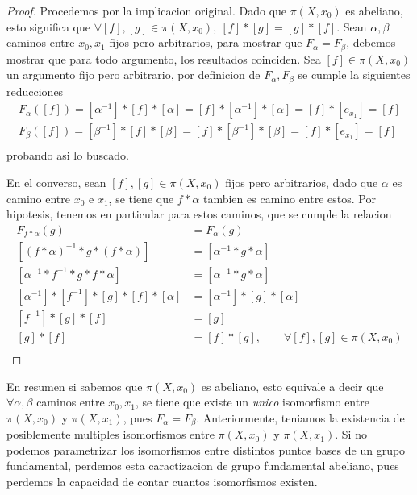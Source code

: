 \begin{proof}
  Procedemos por la implicacion original. Dado que \(\pi (X, x_0)\) es
  abeliano, esto significa que \(\forall [f],[g] \in \pi (X, x_0),\ [f]
  * [g] = [g] * [f]\). Sean \(\alpha, \beta\) caminos entre \(x_0,x_1\)
  fijos pero arbitrarios, para mostrar que \(F_\alpha = F_\beta\),
  debemos mostrar que para todo argumento, los resultados coinciden. Sea
  \([f] \in \pi (X, x_0) \) un argumento fijo pero arbitrario, por
  definicion de \(F_\alpha, F_\beta\) se cumple la siguientes reducciones
  \[
    \begin{matrix}
      F_\alpha ([f]) = [\alpha^{-1}] * [f] * [\alpha] = [f] *
          [\alpha^{-1}] * [\alpha] = [f] * [e_{x_1}] = [f] \\
      F_\beta ([f]) = [\beta^{-1}] * [f] * [\beta] = [f] *
          [\beta^{-1}] * [\beta] = [f] * [e_{x_1}] = [f] \\
    \end{matrix}
  \]
  probando asi lo buscado.

  En el converso, sean \([f],[g] \in \pi (X, x_0) \) fijos pero
  arbitrarios, dado que \(\alpha\) es camino entre \(x_0\) e \(x_1\), se
  tiene que \(f * \alpha\) tambien es camino entre estos. Por hipotesis,
  tenemos en particular para estos caminos, que se cumple la relacion
  \begin{align*}
    F_{f * \alpha} (g) &= F_{\alpha} (g) \\
    [(f * \alpha)^{-1} * g * (f * \alpha) ] &= [\alpha^{-1} * g * \alpha] \\
    [\alpha^{-1} * f^{-1} * g * f * \alpha ] &= [\alpha^{-1} * g * \alpha] \\
    [\alpha^{-1}] * [f^{-1}] * [g] * [f] * [\alpha] &= [\alpha^{-1}] *
        [g] * [\alpha] \\
    [f^{-1}] * [g] * [f] &= [g] \\
    [g] * [f] &= [f] * [g], \qquad \forall [f],[g] \in \pi (X, x_0) \\
  \end{align*}
\end{proof}
En resumen si sabemos que \(\pi (X, x_0)\) es abeliano, esto equivale a
decir que \(\forall \alpha,\beta\) caminos entre \(x_0, x_1\), se tiene
que existe un \emph{unico} isomorfismo entre \(\pi (X,x_0) \) y \( \pi
(X,x_1)\), pues \(F_\alpha = F_\beta\). Anteriormente, teniamos la
existencia de posiblemente multiples isomorfismos entre \(\pi (X, x_0)
\) y \(\pi (X, x_1) \). Si no podemos parametrizar los isomorfismos
entre distintos puntos bases de un grupo fundamental, perdemos esta
caractizacion de grupo fundamental abeliano, pues perdemos la capacidad
de contar cuantos isomorfismos existen.
